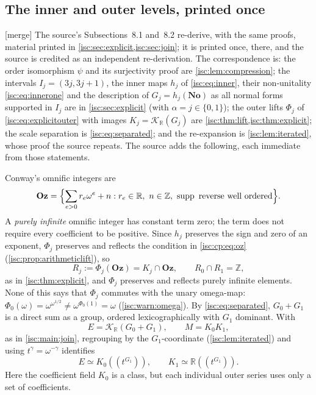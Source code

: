 \documentclass[11pt,letterpaper]{article}
\theoremstyle{definition}
\theoremstyle{remark}
\newcommand{\No}{\mathbf{No}}
\newcommand{\Oz}{\mathbf{Oz}}
\newcommand{\R}{\mathbb R}
\newcommand{\Z}{\mathbb Z}
\newcommand{\K}[2]{\mathcal K_{#1}(#2)}
\newcommand{\supp}{\operatorname{supp}}
\newcommand{\mtag}{\textup{[merge]}}%
\numberwithin{equation}{section}
\begin{document}
\subsection{The inner and outer levels, printed once}\label{isc:cp:sub:copies}

\mtag{} The source's Subsections~8.1 and~8.2 re-derive, with the same
proofs, material printed in \cref{isc:sec:explicit,isc:sec:join}; it is
printed once, there, and the source is credited as an independent
re-derivation. The correspondence is: the order isomorphism $\psi$ and its
surjectivity proof are \cref{isc:lem:compression}; the intervals
$I_j=(3j,3j+1)$, the inner maps $h_j$ of \eqref{isc:eq:inner}, their
non-unitality \eqref{isc:eq:innerone} and the description of
$G_j=h_j(\No)$ as all normal forms supported in $I_j$ are in
\cref{isc:sec:explicit} (with $\alpha=j\in\{0,1\}$); the outer lifts
$\Phi_j$ of \eqref{isc:eq:explicitouter} with images $K_j=\K{\R}{G_j}$ are
\cref{isc:thm:lift,isc:thm:explicit}; the scale separation is
\eqref{isc:eq:separated}; and the re-expansion is \cref{isc:lem:iterated},
whose proof the source repeats. The source adds the following, each
immediate from those statements.

Conway's omnific integers are
\begin{equation}\label{isc:cp:eq:oz}
 \Oz=\Bigl\{\sum_{e>0}r_e\omega^e+n:
           r_e\in\R,\ n\in\Z,\ \supp\text{ reverse well ordered}\Bigr\}.
\end{equation}
A \emph{purely infinite} omnific integer has constant term zero; the term
does not require every coefficient to be positive. Since $h_j$ preserves
the sign and zero of an exponent, $\Phi_j$ preserves and reflects the
condition in \eqref{isc:cp:eq:oz} (\cref{isc:prop:arithmeticlift}), so
\begin{equation}\label{isc:cp:eq:Ri}
 R_j:=\Phi_j(\Oz)=K_j\cap\Oz,\qquad R_0\cap R_1=\Z,
\end{equation}
as in \cref{isc:thm:explicit}, and $\Phi_j$ preserves and reflects purely
infinite elements. None of this says that $\Phi_j$ commutes with the unary
omega-map: $\Phi_0(\omega)=\omega^{\omega^{1/2}}\ne\omega^{\Phi_0(1)}=\omega$
(\cref{isc:warn:omega}). By \eqref{isc:eq:separated}, $G_0+G_1$ is a direct
sum as a group, ordered lexicographically with $G_1$ dominant. With
\[
 E=\K{\R}{G_0+G_1},\qquad M=K_0K_1,
\]
as in \cref{isc:main:join}, regrouping by the $G_1$-coordinate
(\cref{isc:lem:iterated}) and using $t^\gamma=\omega^{-\gamma}$ identifies
\begin{equation}\label{isc:cp:eq:iterated}
 E\simeq K_0((t^{G_1})),\qquad
 K_1\simeq\R((t^{G_1})).
\end{equation}
Here the coefficient field $K_0$ is a class, but each individual outer
series uses only a set of coefficients.
\end{document}
